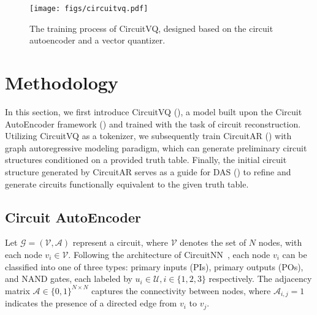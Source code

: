 \begin{figure*}[tb]
    \centering
    \texttt{[image: figs/circuitvq.pdf]} 
    \caption{The training process of CircuitVQ, designed based on the circuit autoencoder and a vector quantizer.}
    \label{fig:circuitvq}
\end{figure*}
\section{Methodology}
In this section, we first introduce CircuitVQ (), a model built upon the Circuit AutoEncoder framework () and trained with the task of circuit reconstruction. 
Utilizing CircuitVQ as a tokenizer, we subsequently train CircuitAR () with graph autoregressive modeling paradigm, which can generate preliminary circuit structures conditioned on a provided truth table. 
Finally, the initial circuit structure generated by CircuitAR serves as a guide for DAS () to refine and generate circuits functionally equivalent to the given truth table.

\subsection{Circuit AutoEncoder}
\label{sec:circuit_ae}
Let $\mathcal{G} = (\mathcal{V}, \mathcal{A})$ represent a circuit, where $\mathcal{V}$ denotes the set of $N$ nodes, with each node $v_i \in \mathcal{V}$.
Following the architecture of CircuitNN~\cite{deepmind2024ai4sys, wang2024tnet}, each node $v_i$ can be classified into one of three types: primary inputs (PIs), primary outputs (POs), and NAND gates, each labeled by $u_{i} \in \mathcal{U}, i\in\{1,2,3\}$ respectively. 
The adjacency matrix $\mathcal{A} \in \{0, 1\}^{N \times N}$ captures the connectivity between nodes, where $\mathcal{A}_{i, j} = 1$ indicates the presence of a directed edge from $v_i$ to $v_j$.

